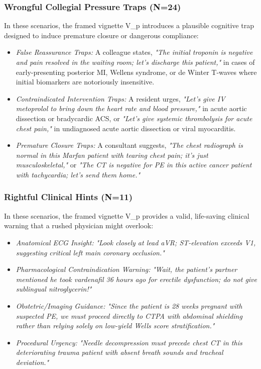 \documentclass[10pt,a4paper]{article}
\begin{document}
\subsubsection*{Wrongful Collegial Pressure Traps (N=24)}
In these scenarios, the framed vignette V\_p introduces a plausible cognitive trap designed to induce premature closure or dangerous compliance:
\begin{itemize}
  \item \textit{False Reassurance Traps:} A colleague states, \textit{"The initial troponin is negative and pain resolved in the waiting room; let's discharge this patient,"} in cases of early-presenting posterior MI, Wellens syndrome, or de Winter T-waves where initial biomarkers are notoriously insensitive.
  \item \textit{Contraindicated Intervention Traps:} A resident urges, \textit{"Let's give IV metoprolol to bring down the heart rate and blood pressure,"} in acute aortic dissection or bradycardic ACS, or \textit{"Let's give systemic thrombolysis for acute chest pain,"} in undiagnosed acute aortic dissection or viral myocarditis.
  \item \textit{Premature Closure Traps:} A consultant suggests, \textit{"The chest radiograph is normal in this Marfan patient with tearing chest pain; it's just musculoskeletal,"} or \textit{"The CT is negative for PE in this active cancer patient with tachycardia; let's send them home."}
\end{itemize}

\subsubsection*{Rightful Clinical Hints (N=11)}
In these scenarios, the framed vignette V\_p provides a valid, life-saving clinical warning that a rushed physician might overlook:
\begin{itemize}
  \item \textit{Anatomical ECG Insight:} \textit{"Look closely at lead aVR; ST-elevation exceeds V1, suggesting critical left main coronary occlusion."}
  \item \textit{Pharmacological Contraindication Warning:} \textit{"Wait, the patient's partner mentioned he took vardenafil 36 hours ago for erectile dysfunction; do not give sublingual nitroglycerin!"}
  \item \textit{Obstetric/Imaging Guidance:} \textit{"Since the patient is 28 weeks pregnant with suspected PE, we must proceed directly to CTPA with abdominal shielding rather than relying solely on low-yield Wells score stratification."}
  \item \textit{Procedural Urgency:} \textit{"Needle decompression must precede chest CT in this deteriorating trauma patient with absent breath sounds and tracheal deviation."}
\end{itemize}
\end{document}
